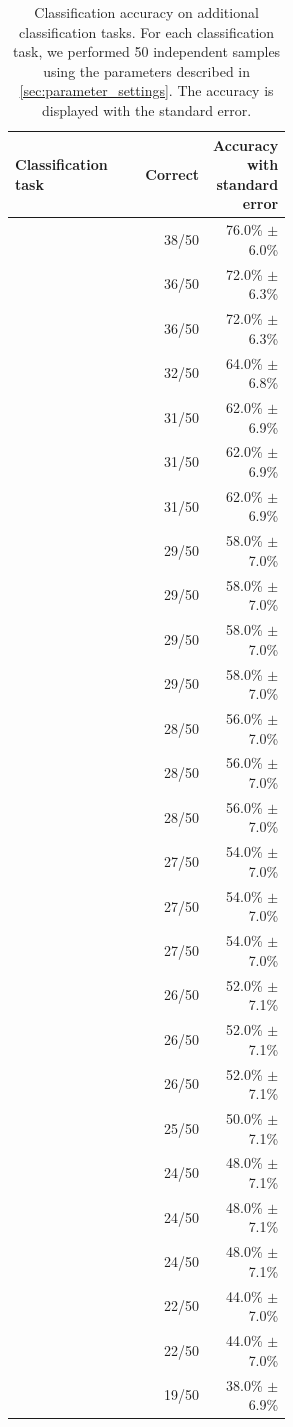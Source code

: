 \documentclass[11pt, letterpaper]{article}
\begin{document}
\begin{table}
\centering
\begin{tabular}{L{0.55\linewidth}rr}
\toprule
Classification task & Correct & Accuracy with standard error \\
\midrule
{} & 38/50 & 76.0\% $\pm$ 6.0\% \\
 & 36/50 & 72.0\% $\pm$ 6.3\% \\
 & 36/50 & 72.0\% $\pm$ 6.3\% \\
 & 32/50 & 64.0\% $\pm$ 6.8\% \\
 & 31/50 & 62.0\% $\pm$ 6.9\% \\
 & 31/50 & 62.0\% $\pm$ 6.9\% \\
 & 31/50 & 62.0\% $\pm$ 6.9\% \\
 & 29/50 & 58.0\% $\pm$ 7.0\% \\
 & 29/50 & 58.0\% $\pm$ 7.0\% \\
 & 29/50 & 58.0\% $\pm$ 7.0\% \\
 & 29/50 & 58.0\% $\pm$ 7.0\% \\
 & 28/50 & 56.0\% $\pm$ 7.0\% \\
 & 28/50 & 56.0\% $\pm$ 7.0\% \\
 & 28/50 & 56.0\% $\pm$ 7.0\% \\
 & 27/50 & 54.0\% $\pm$ 7.0\% \\
 & 27/50 & 54.0\% $\pm$ 7.0\% \\
 & 27/50 & 54.0\% $\pm$ 7.0\% \\
 & 26/50 & 52.0\% $\pm$ 7.1\% \\
 & 26/50 & 52.0\% $\pm$ 7.1\% \\
 & 26/50 & 52.0\% $\pm$ 7.1\% \\
 & 25/50 & 50.0\% $\pm$ 7.1\% \\
 & 24/50 & 48.0\% $\pm$ 7.1\% \\
 & 24/50 & 48.0\% $\pm$ 7.1\% \\
 & 24/50 & 48.0\% $\pm$ 7.1\% \\
 & 22/50 & 44.0\% $\pm$ 7.0\% \\
 & 22/50 & 44.0\% $\pm$ 7.0\% \\
 & 19/50 & 38.0\% $\pm$ 6.9\% \\
\bottomrule
\end{tabular}
\caption{Classification accuracy on additional classification tasks.
For each classification task, we performed 50 independent samples using the parameters described in \cref{sec:parameter_settings}.
The accuracy is displayed with the standard error.} \label{tab:fail_performance}
\end{table}
\end{document}
